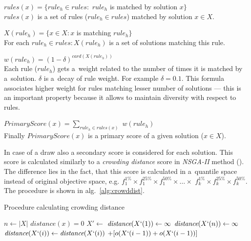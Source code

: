 \begin{description}
\item $\textit{rules}(x) = \{\textit{rule}_h \in \textit{rules} :$
$\textit{rule}_h$ is matched by solution $x\}$ \\
$\textit{rules}(x)$ is a set of rules ($\textit{rule}_h \in \textit{rules}$)
matched by solution $x \in X$. 

\item $X(\textit{rule}_h) = \{x \in X: x$ is matching $\textit{rule}_h\}$
\\ For each $\textit{rule}_h \in rules: X(\textit{rule}_h)$ is a set of
solutions matching this rule.

\item $w(\textit{rule}_h) = (1 - \delta)^{\textit{card}(X(\textit{rule}_h))}$
  \\ Each rule ($\textit{rule}_h$) gets a~weight related to the number of
  times it is matched by a~solution. $\delta$ is a~decay of rule weight. For
  example $\delta = 0.1$. This formula associates higher weight for rules
  matching lesser number of solutions --- this is an important property
  because it allows to maintain diversity with respect to rules.

\item $\textit{PrimaryScore}(x) = \sum_{\textit{rule}_h \in rules(x)}$
  $w(\textit{rule}_h)$ \\ Finally $\textit{PrimaryScore}(x)$ is a primary
  score of a given solution ($x \in X$).
\end{description}

In case of a draw also a secondary score is considered for each solution. This
score is calculated similarly to a \textit{crowding distance} score in
\textit{NSGA-II} method (\cite{Deb00}). The difference lies in the fact, that
this score is calculated in a~quantile space instead of original objective
space, e.g. $f^{1\%}_1 \times f^{25\%}_1 \times f^{50\%}_1 \times \dots \times
$ $f^{1\%}_k \times f^{25\%}_k \times f^{50\%}_k$. The procedure is shown in
alg.~\ref{alg:crowddist}.


\begin{algorithm}
  \caption{Procedure calculating crowding distance}\label{alg:crowddist}
  \begin{algorithmic}[1]
    \State $n \gets |X|$ 
     
    \State $\textit{distance}(x) = 0$
    \EndFor
    \State $X' \gets$  
    \State $\textit{distance}(X`(1)) \gets \infty$ 
    \State $\textit{distance}(X`(n)) \gets \infty$ 
    \EndFor
     
    \State $\textit{distance}(X`(i)) \gets \textit{distance}(X`(i))$
    $+ [o(X`(i-1)) + o(X`(i-1))]$
    \EndFor
    \EndProcedure{}
  \end{algorithmic}
\end{algorithm}

